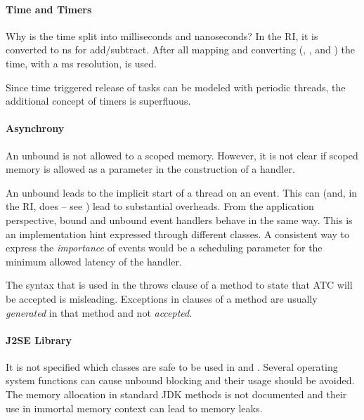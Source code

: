 \paragraph{Time and Timers }

Why is the time split into milliseconds and nanoseconds? In the RI,
it is converted to ns for add/subtract. After all mapping and
converting (, ,
 and ) the
 time, with a ms resolution, is
used.

Since time triggered release of tasks can be modeled with periodic
threads, the additional concept of timers is superfluous.

\paragraph{Asynchrony}

An unbound  is not allowed to 
a scoped memory. However, it is not clear if scoped memory is
allowed as a parameter in the construction of a handler.

An unbound  leads to the implicit start of a
thread on an event. This can (and, in the RI, does -- see
\cite{701668}) lead to substantial overheads. From the application
perspective, bound and unbound event handlers behave in the same
way. This is an implementation hint expressed through different
classes. A consistent way to express the \textit{importance} of
events would be a scheduling parameter for the minimum allowed
latency of the handler.

The syntax that is used in the throws clause of a method to state
that ATC will be accepted is misleading. Exceptions in 
clauses of a method are usually \emph{generated} in that method and
not \textit{accepted}.

\paragraph{J2SE Library}

It is not specified which classes are safe to be used in
\linebreak[4] and .
Several operating system functions can cause unbound blocking and
their usage should be avoided. The memory allocation in standard JDK
methods is not documented and their use in immortal memory context
can lead to memory leaks.

